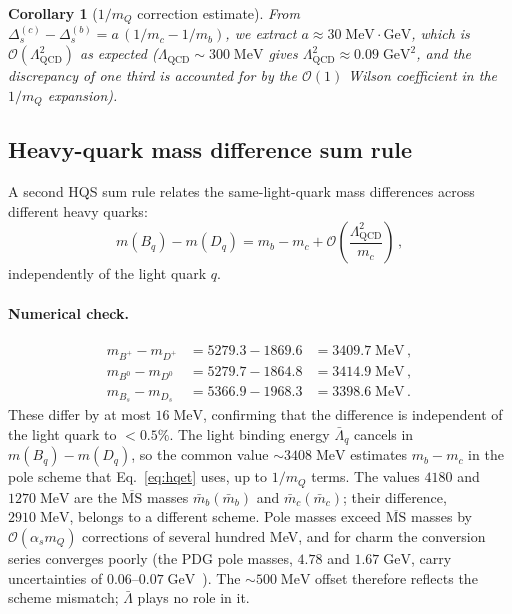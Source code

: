 \documentclass[11pt,a4paper]{article}
\newcommand{\QCD}{\ensuremath{\mathrm{QCD}}}
\newcommand{\Lbar}{\bar{\Lambda}}
\newcommand{\LQCD}{\Lambda_{\QCD}}
\newcommand{\Ord}{\mathcal{O}}
\theoremstyle{plain}
\newtheorem{corollary}{Corollary}
\begin{document}
\begin{corollary}[$1/m_Q$ correction estimate]
From $\Delta_s^{(c)} - \Delta_s^{(b)} = a\,(1/m_c - 1/m_b)$, we
extract $a \approx 30\;\text{MeV} \cdot \text{GeV}$, which is
$\Ord(\LQCD^2)$ as expected ($\LQCD \sim 300\;\text{MeV}$ gives
$\LQCD^2 \approx 0.09\;\text{GeV}^2$, and the discrepancy of one
third is accounted for by the $\Ord(1)$ Wilson coefficient in the
$1/m_Q$ expansion).
\end{corollary}

\subsection{Heavy-quark mass difference sum rule}

A second HQS sum rule relates the same-light-quark mass differences
across different heavy quarks:
\begin{equation}\label{eq:hqs-heavy-diff}
  m(B_q) - m(D_q) = m_b - m_c + \Ord\!\left(\frac{\LQCD^2}{m_c}\right)\,,
\end{equation}
independently of the light quark $q$.

\paragraph{Numerical check.}
\begin{equation}
\renewcommand{\arraystretch}{1.2}
\begin{array}{lll}
  m_{B^+} - m_{D^+} &= 5279.3 - 1869.6 &= 3409.7\;\text{MeV}\,, \\
  m_{B^0} - m_{D^0} &= 5279.7 - 1864.8 &= 3414.9\;\text{MeV}\,, \\
  m_{B_s} - m_{D_s} &= 5366.9 - 1968.3 &= 3398.6\;\text{MeV}\,.
\end{array}
\end{equation}
These differ by at most $16\;\text{MeV}$, confirming that the
difference is independent of the light quark to $< 0.5\%$.  The light
binding energy $\Lbar_q$ cancels in $m(B_q) - m(D_q)$, so the common
value $\sim 3408\;\text{MeV}$ estimates $m_b - m_c$ in the pole scheme
that Eq.~\eqref{eq:hqet} uses, up to $1/m_Q$ terms.  The values $4180$
and $1270\;\text{MeV}$ are the $\overline{\text{MS}}$ masses
$\bar{m}_b(\bar{m}_b)$ and $\bar{m}_c(\bar{m}_c)$; their difference,
$2910\;\text{MeV}$, belongs to a different scheme.  Pole masses exceed
$\overline{\text{MS}}$ masses by $\Ord(\alpha_s m_Q)$ corrections of
several hundred MeV, and for charm the conversion series converges
poorly (the PDG pole masses, $4.78$ and $1.67\;\text{GeV}$, carry
uncertainties of $0.06$--$0.07\;\text{GeV}$~\cite{PDG2024}).  The
$\sim 500\;\text{MeV}$ offset therefore reflects the scheme mismatch;
$\Lbar$ plays no role in it.
\end{document}
